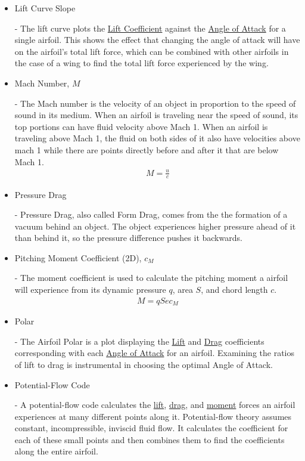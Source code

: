 \documentclass{article}
\begin{document}
\begin{itemize}
	\item \hypertarget{LC}{Lift Curve Slope} - The lift curve plots the \hyperlink{CL}{Lift Coefficient} against the \hyperlink{alpha}{Angle of Attack} for a single airfoil. This shows the effect that changing the angle of attack will have on the airfoil's total lift force, which can be combined with other airfoils in the case of a wing to find the total lift force experienced by the wing.
		
	\item \hypertarget{M}{Mach Number, $M$} - The Mach number is the velocity of an object in proportion to the speed of sound in its medium. When an airfoil is traveling near the speed of sound, its top portions can have fluid velocity above Mach 1. When an airfoil is traveling above Mach 1, the fluid on both sides of it also have velocities above mach 1 while there are points directly before and after it that are below Mach 1.
		\begin{equation} \label{eq:15}
		\begin{aligned}
        			M = \frac{u}{c}
	    	\end{aligned}
		\end{equation}
		
	\item \hypertarget{DP}{Pressure Drag} - Pressure Drag, also called Form Drag, comes from the the formation of a vacuum behind an object. The object experiences higher pressure ahead of it than behind it, so the pressure difference pushes it backwards.
		
	\item \hypertarget{CM}{Pitching Moment Coefficient (2D), $c_{M}$} - The moment coefficient is used to calculate the pitching moment a airfoil will experience from its dynamic pressure $q$, area $S$, and chord length $c$.
		\begin{equation} \label{eq:16}
		\begin{aligned}
        			M = q S e c_{M}
	    	\end{aligned}
		\end{equation}

	\item \hypertarget{AP}{Polar} - The Airfoil Polar is a plot displaying the  \hyperlink{CL}{Lift} and  \hyperlink{CD}{Drag} coefficients corresponding with each \hyperlink{alpha}{Angle of Attack} for an airfoil. Examining the ratios of lift to drag is instrumental in choosing the optimal Angle of Attack.
	
	\item \hypertarget{PFC}{Potential-Flow Code} - A potential-flow code calculates the \hyperlink{CL}{lift}, \hyperlink{CD}{drag}, and \hyperlink{CM}{moment} forces an airfoil experiences at many different points along it. Potential-flow theory assumes constant, incompressible, inviscid fluid flow. It calculates the coefficient for each of these small points and then combines them to find the coefficients along the entire airfoil.
	

\end{itemize}
\end{document}
